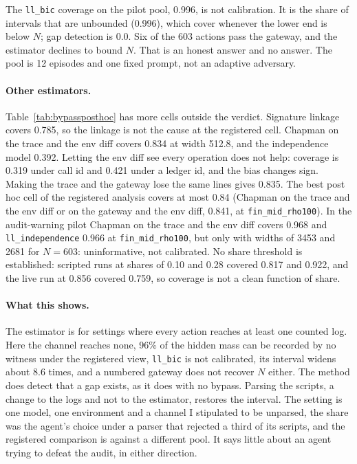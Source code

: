 \documentclass[11pt]{article}
\begin{document}
The \texttt{ll\_bic} coverage on the pilot pool, 0.996, is not calibration. It is the
share of intervals that are unbounded (0.996), which cover whenever the lower end is
below $N$; gap detection is 0.0. Six of the 603 actions pass the gateway, and the
estimator declines to bound $N$. That is an honest answer and no answer. The pool is 12
episodes and one fixed prompt, not an adaptive adversary.

\begin{table}[h]
\centering\small

\caption{The registered cell and its reference, other cells and estimators on the
same episodes, and the audit-warning pilot.}
\label{tab:bypassposthoc}
\end{table}

\paragraph{Other estimators.} Table~\ref{tab:bypassposthoc} has more cells outside the
verdict. Signature linkage covers 0.785, so the linkage is not the cause at the registered
cell. Chapman on the trace and the env diff covers 0.834 at width 512.8, and the
independence model 0.392. Letting the env diff see every operation does not help:
coverage is 0.319 under call id and 0.421 under a ledger id, and the bias changes sign.
Making the trace and the gateway lose the same lines gives 0.835. The best post hoc cell
of the registered analysis covers at most 0.84 (Chapman on the trace and the env
diff or on the gateway and the env diff, 0.841, at \texttt{fin\_mid\_rho100}). In the audit-warning pilot
Chapman on the trace and the env diff covers 0.968 and \texttt{ll\_independence} 0.966
at \texttt{fin\_mid\_rho100}, but only with widths of 3453 and 2681 for $N=603$:
uninformative, not calibrated. No share threshold is established: scripted runs at
shares of 0.10 and 0.28 covered 0.817 and 0.922, and the live run at 0.856 covered
0.759, so coverage is not a clean function of share.

\paragraph{What this shows.} The estimator is for settings where every action reaches at
least one counted log. Here the channel reaches none, 96\% of the hidden mass can be
recorded by no witness under the registered view, \texttt{ll\_bic} is not calibrated, its
interval widens about 8.6 times, and a numbered gateway does not recover $N$ either.
The method does detect that a gap exists, as it does with no bypass. Parsing the
scripts, a change to the logs and not to the estimator, restores the interval. The setting
is one model, one environment and a channel I stipulated to be unparsed, the share was
the agent's choice under a parser that rejected a third of its scripts, and the
registered comparison is against a different pool. It says little about an agent trying
to defeat the audit, in either direction.
\end{document}

